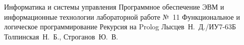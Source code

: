 \documentclass{bmstu}
\begin{document}
	
	\makereporttitle
	{Информатика и системы управления} %
	{Программное обеспечение ЭВМ и информационные технологии}
	{лабораторной работе №~11} %
	{Функциональное и логическое программирование} %
	{Рекурсия на Prolog} %
	{} %
	{Лысцев~Н.~Д./ИУ7-63Б} %
	{Толпинская~Н.~Б., Строганов~Ю.~В.} %
	{}
	
	
	
	
\end{document}
